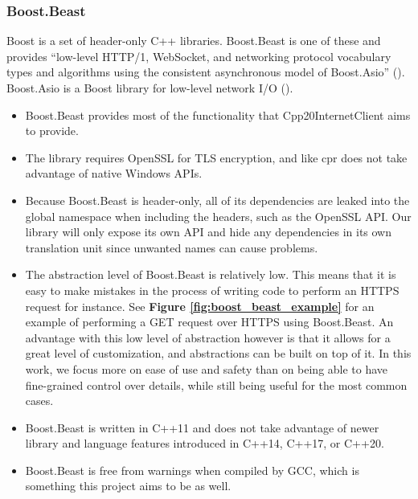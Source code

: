 \documentclass[12pt, a4paper]{article}
\begin{document}
\subsubsection{Boost.Beast}
Boost is a set of header-only C++ libraries. Boost.Beast is one of these and provides “low-level HTTP/1, WebSocket, and networking protocol vocabulary types and algorithms using the consistent asynchronous model of Boost.Asio” (\cite{BoostBeast}). Boost.Asio is a Boost library for low-level network I/O (\cite{BoostAsio}).
\begin{itemize}
	\item Boost.Beast provides most of the functionality that Cpp20InternetClient aims to provide.
	\item The library requires OpenSSL for TLS encryption, and like cpr does not take advantage of native Windows APIs.
	\item Because Boost.Beast is header-only, all of its dependencies are leaked into the global namespace when including the headers, such as the OpenSSL API. Our library will only expose its own API and hide any dependencies in its own translation unit since unwanted names can cause problems.
	\item The abstraction level of Boost.Beast is relatively low. This means that it is easy to make mistakes in the process of writing code to perform an HTTPS request for instance. See \textbf{Figure \ref{fig:boost_beast_example}} for an example of performing a GET request over HTTPS using Boost.Beast. An advantage with this low level of abstraction however is that it allows for a great level of customization, and abstractions can be built on top of it. In this work, we focus more on ease of use and safety than on being able to have fine-grained control over details, while still being useful for the most common cases.
	\item Boost.Beast is written in C++11 and does not take advantage of newer library and language features introduced in C++14, C++17, or C++20.
	\item Boost.Beast is free from warnings when compiled by GCC, which is something this project aims to be as well.
\end{itemize}
\end{document}
